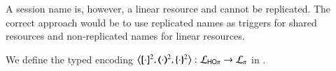 A session name is, however, a linear resource and cannot be replicated.
The correct approach would be to use replicated names
as triggers for shared resources and non-replicated names
for linear resources.

\smallskip 

\begin{definition}
\label{d:enc:hopitopi}
We define the typed encoding 
$\enco{\map{\cdot}^{2}, \mapt{\cdot}^{2}, \mapa{\cdot}^{2}}: \tyl{L}_{\HOp} \to \tyl{L}_{\sessp}$  
in . 
\end{definition}

\smallskip 

